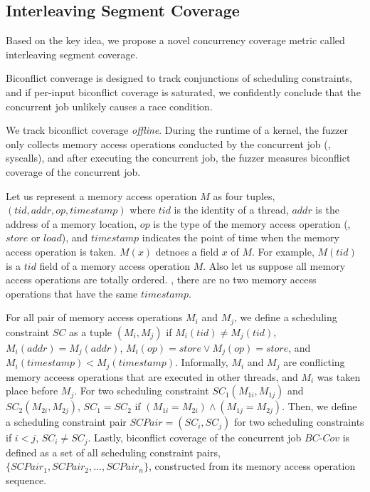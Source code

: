 \subsection{Interleaving Segment Coverage}
\label{ss:coverage}

Based on the key idea, we propose a novel concurrency coverage metric
called interleaving segment coverage.
%



\newcommand{\mutable}{mutable edge\xspace}
\newcommand{\mutables}{mutable edges\xspace}
\newcommand{\immutable}{immutable edge\xspace}
\newcommand{\immutables}{immutable edges\xspace}
%
Biconflict converage is designed to track conjunctions of scheduling
constraints, and if per-input biconflict coverage is saturated, we
confidently conclude that the concurrent job unlikely causes a race
condition.

We track biconflict coverage \textit{offline}. During the runtime of a
kernel, the fuzzer only collects memory access operations conducted by
the concurrent job (\eg, syscalls), and after executing the concurrent
job, the fuzzer measures biconflict coverage of the concurrent job.

%
Let us represent a memory access operation $M$ as four tuples,
$(tid, addr, op, timestamp)$ where $tid$ is the identity of a thread,
$addr$ is the address of a memory location, $op$ is the type of the
memory access operation (\ie, $store$ or $load$), and $timestamp$
indicates the point of time when the memory access operation is taken.
%
$M(x)$ detnoes a field $x$ of $M$. For example, $M(tid)$ is a $tid$
field of a memory access operation $M$.
%
Also let us suppose all memory access operations are totally
ordered. \ie, there are no two memory access operations that have the
same $timestamp$.

For all pair of memory access operations $M_i$ and $M_j$, we define a
scheduling constraint $SC$ as a tuple $(M_i, M_j)$ if
$M_i(tid) \neq M_j(tid)$, $M_i(addr) = M_j(addr)$,
$M_i(op) = store \vee M_j(op) = store$, and
$M_i(timestamp) < M_j(timestamp)$.
%
Informally, $M_i$ and $M_j$ are conflicting memory acceess operations
that are executed in other threads, and $M_i$ was taken place before
$M_j$.
%
For two scheduling constraint $SC_1(M_{1i}, M_{1j})$ and
$SC_2(M_{2i}, M_{2j})$, $SC_1 = SC_2$ if
$(M_{1i} = M_{2i}) \wedge (M_{1j} = M_{2j})$.
%
Then, we define a scheduling constraint pair $SCPair = (SC_i, SC_j)$
for two scheduling constraints if $i < j$, $SC_i \neq SC_j$.
%
Lastly, biconflict coverage of the concurrent job $BC\mbox{-}Cov$ is
defined as a set of all scheduling constraint pairs,
$\{SCPair_1, SCPair_2, ..., SCPair_n\}$, constructed from its memory
access operation sequence.



